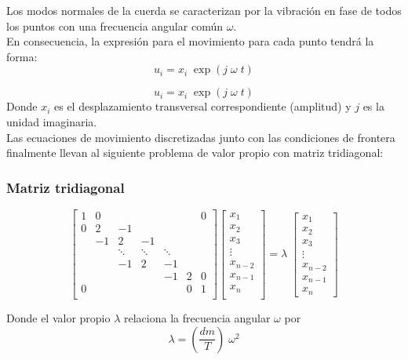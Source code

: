 \begin{frame}
Los modos normales de la cuerda se caracterizan por la vibración en fase de todos los puntos con una frecuencia angular común $\omega$.
\\
\bigskip
En consecuencia, la expresión para el movimiento para cada punto tendrá la forma:
\[ u_{i} = x_{i} \; \exp(j \; \omega \; t) \]
\end{frame}
\begin{frame}
\[ u_{i} = x_{i} \; \exp(j \; \omega \; t) \]
Donde $x_{i}$ es el desplazamiento transversal correspondiente (amplitud) y $j$ es la unidad imaginaria.
\\
\bigskip
Las ecuaciones de movimiento discretizadas junto con las condiciones de frontera finalmente llevan al siguiente problema de valor propio con matriz tridiagonal:
\end{frame}
\begin{frame}
\frametitle{Matriz tridiagonal}
\[ \begin{bmatrix}
1 & 0  &    &    & & & 0 \\
0 & 2  & -1 &    & & &   \\
  & -1 & 2  & -1 & & &   \\
  &  & \ddots & \ddots & \ddots & &   \\
  &  & -1  & 2 & -1 & &   \\
  &  &  &  & -1 & 2 & 0   \\
0 &  &  &  & &  0 & 1   \\
  
\end{bmatrix}
\begin{bmatrix}
x_{1} \\
x_{2} \\
x_{3} \\
\vdots \\
x_{n-2} \\
x_{n-1} \\
x_{n} \\
\end{bmatrix} = \lambda \;
\begin{bmatrix}
x_{1} \\
x_{2} \\
x_{3} \\
\vdots \\
x_{n-2} \\
x_{n-1} \\
x_{n}
\end{bmatrix} \]
\end{frame}
\begin{frame}
Donde el valor propio $\lambda$ relaciona la frecuencia angular $\omega$ por
\[ \lambda = \left( \dfrac{d m}{T} \right) \; \omega^{2}  \]
\end{frame}

